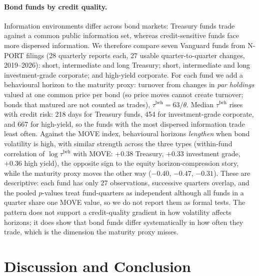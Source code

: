 \documentclass[preprint,12pt,authoryear]{elsarticle}
\begin{document}
\paragraph{Bond funds by credit quality.}
Information environments differ across bond markets: Treasury funds trade
against a common public information set, whereas credit-sensitive funds face
more dispersed information.
We therefore compare seven Vanguard funds from N-PORT filings (28 quarterly
reports each, 27 usable quarter-to-quarter changes, 2019--2026): short,
intermediate and long Treasury; short, intermediate and long
investment-grade corporate; and high-yield corporate.
For each fund we add a behavioural horizon to the maturity proxy: turnover from
changes in \emph{par holdings} valued at one common price per bond (so price
moves cannot create turnover; bonds that matured are not counted as trades),
$\tau^{\text{beh}} = 63/\theta$.
Median $\tau^{\text{beh}}$ rises with credit risk: 218 days for Treasury funds,
454 for investment-grade corporate, and 667 for high-yield, so the funds with
the most dispersed information trade least often.
Against the MOVE index, behavioural horizons \emph{lengthen} when bond
volatility is high, with similar strength across the three types (within-fund
correlation of $\log\tau^{\text{beh}}$ with MOVE: $+0.38$ Treasury, $+0.33$
investment grade, $+0.36$ high yield), the opposite sign to the equity
horizon-compression story, while the maturity proxy moves the other way
($-0.40$, $-0.47$, $-0.31$).
These are descriptive: each fund has only 27 observations, successive quarters
overlap, and the pooled $p$-values treat fund-quarters as independent although
all funds in a quarter share one MOVE value, so we do not report them as
formal tests.
The pattern does not support a credit-quality gradient in how volatility
affects horizons; it does show that bond funds differ systematically in how
often they trade, which is the dimension the maturity proxy misses.

\section{Discussion and Conclusion}
\label{sec:conclusion}
\end{document}
